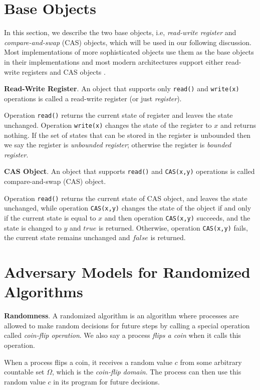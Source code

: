 \section{Base Objects}
In this section, we describe the two base objects, i.e, \emph{read-write register} and \emph{compare-and-swap} (CAS)
objects, which will be used in our following discussion. Most implementations
of more sophisticated objects use them as the base objects in their implementations and
most modern architectures support either read-write registers and CAS objects \cite{itanium} \cite{weaver1994sparc}.

\textbf{Read-Write Register}.
An object that supports only \texttt{read()} and \texttt{write(x)} operations is called
a read-write register (or just \emph{register}).

Operation \texttt{read()} returns the current state of register and
leaves the state unchanged. Operation \texttt{write(x)} changes the state of the register to $x$ and returns nothing.
If the set of states that can be stored in the register is unbounded then we say the register is \emph{unbounded register};
otherwise the register is \emph{bounded register}.

\textbf{CAS Object}. An object that supports \texttt{read()} and \texttt{CAS(x,y)} operations is called compare-and-swap (CAS) object.

Operation \texttt{read()} returns the current state of CAS object, and
leaves the state unchanged, while operation \texttt{CAS(x,y)} changes the state of
the object if and only if the current state is equal to $x$ and then operation \texttt{CAS(x,y)} succeeds, and the state is changed
to $y$ and $true$ is returned. Otherwise, operation \texttt{CAS(x,y)} fails, the current state remains unchanged and
$false$ is returned.

\section{Adversary Models for Randomized Algorithms}

\textbf{Randomness}.
A randomized algorithm is an algorithm where processes are allowed to make random decisions for future steps
by calling a special operation called \emph{coin-flip operation}. We also say a process \emph{flips a coin}
when it calls this operation.

When a process flips a coin, it receives a random value $c$ from some arbitrary countable set $\Omega$,
which is the \emph{coin-flip domain}. The process can then use this random value $c$ in its program for future decisions.

